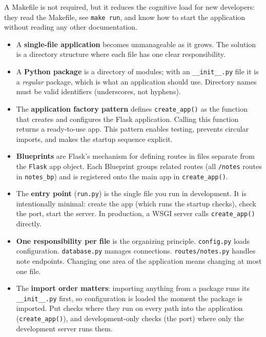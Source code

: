 \noindent{}A Makefile is not required, but it reduces the cognitive load for new developers: they read the Makefile, see \texttt{make\ run}, and know how to start the application without reading any other documentation.

\label{15-structuring-the-application:key-takeaways}
\begin{takeaways}

\begin{itemize}
\tightlist
\item
  A \textbf{single-file application} becomes unmanageable as it grows. The solution is a directory structure where each file has one clear responsibility.
\item
  A \textbf{Python package} is a directory of modules; with an \texttt{\_\_init\_\_.py} file it is a \emph{regular} package, which is what an application should use. Directory names must be valid identifiers (underscores, not hyphens).
\item
  The \textbf{application factory pattern} defines \texttt{create\_app()} as the function that creates and configures the Flask application. Calling this function returns a ready-to-use app. This pattern enables testing, prevents circular imports, and makes the startup sequence explicit.
\item
  \textbf{Blueprints} are Flask's mechanism for defining routes in files separate from the \texttt{Flask} app object. Each Blueprint groups related routes (all \texttt{/notes} routes in \texttt{notes\_bp}) and is registered onto the main app in \texttt{create\_app()}.
\item
  The \textbf{entry point} (\texttt{run.py}) is the single file you run in development. It is intentionally minimal: create the app (which runs the startup checks), check the port, start the server. In production, a WSGI server calls \texttt{create\_app()} directly.
\item
  \textbf{One responsibility per file} is the organizing principle. \texttt{config.py} loads configuration. \texttt{database.py} manages connections. \texttt{routes/notes.py} handles note endpoints. Changing one area of the application means changing at most one file.
\item
  The \textbf{import order matters}: importing anything from a package runs its \texttt{\_\_init\_\_.py} first, so configuration is loaded the moment the package is imported. Put checks where they run on every path into the application (\texttt{create\_app()}), and development-only checks (the port) where only the development server runs them.

\end{itemize}
\end{takeaways}
